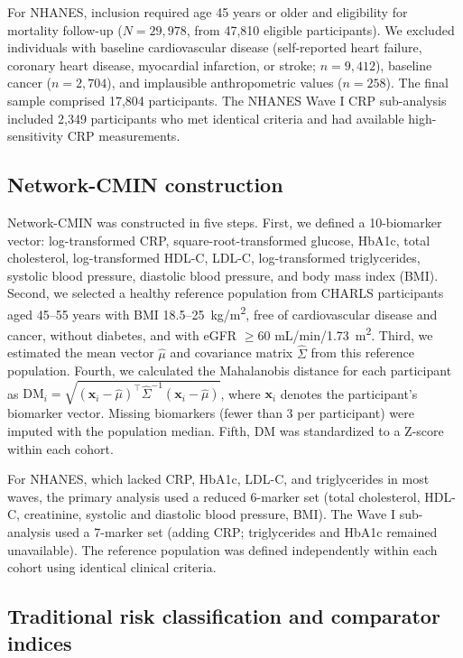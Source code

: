 \documentclass[11pt,a4paper]{article}
\begin{document}
For NHANES, inclusion required age 45 years or older and eligibility for mortality follow-up ($N = 29{,}978$, from 47,810 eligible participants). We excluded individuals with baseline cardiovascular disease (self-reported heart failure, coronary heart disease, myocardial infarction, or stroke; $n = 9{,}412$), baseline cancer ($n = 2{,}704$), and implausible anthropometric values ($n = 258$). The final sample comprised 17,804 participants. The NHANES Wave I CRP sub-analysis included 2,349 participants who met identical criteria and had available high-sensitivity CRP measurements.

\subsection{Network-CMIN construction}

Network-CMIN was constructed in five steps. First, we defined a 10-biomarker vector: log-transformed CRP, square-root-transformed glucose, HbA1c, total cholesterol, log-transformed HDL-C, LDL-C, log-transformed triglycerides, systolic blood pressure, diastolic blood pressure, and body mass index (BMI). Second, we selected a healthy reference population from CHARLS participants aged 45--55 years with BMI 18.5--25~kg/m\textsuperscript{2}, free of cardiovascular disease and cancer, without diabetes, and with eGFR $\geq$60 mL/min/1.73~m\textsuperscript{2}. Third, we estimated the mean vector $\hat{\mu}$ and covariance matrix $\hat{\Sigma}$ from this reference population. Fourth, we calculated the Mahalanobis distance for each participant as $\text{DM}_i = \sqrt{(\mathbf{x}_i - \hat{\mu})^\top \hat{\Sigma}^{-1} (\mathbf{x}_i - \hat{\mu})}$, where $\mathbf{x}_i$ denotes the participant's biomarker vector. Missing biomarkers (fewer than 3 per participant) were imputed with the population median. Fifth, DM was standardized to a Z-score within each cohort.

For NHANES, which lacked CRP, HbA1c, LDL-C, and triglycerides in most waves, the primary analysis used a reduced 6-marker set (total cholesterol, HDL-C, creatinine, systolic and diastolic blood pressure, BMI). The Wave I sub-analysis used a 7-marker set (adding CRP; triglycerides and HbA1c remained unavailable). The reference population was defined independently within each cohort using identical clinical criteria.

\subsection{Traditional risk classification and comparator indices}
\end{document}
